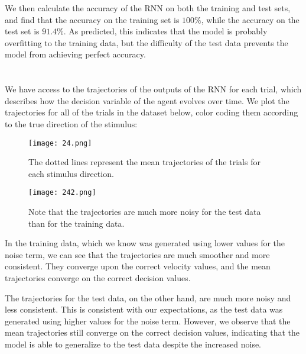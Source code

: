 \documentclass{article}
\begin{document}
We then calculate the accuracy of the RNN on both the training and test sets, and find that the accuracy on the training set is $100\%$, while the accuracy on the test set is $91.4\%$. As predicted, this indicates that the model is probably overfitting to the training data, but the difficulty of the test data prevents the model from achieving perfect accuracy.
\vspace{1em}


\section{}

We have access to the trajectories of the outputs of the RNN for each trial, which describes how the decision variable of the agent evolves over time. We plot the trajectories for all of the trials in the dataset below, color coding them according to the true direction of the stimulus:

\begin{figure}[ht]
    \centering
    \texttt{[image: 24.png]}
    \caption{The dotted lines represent the mean trajectories of the trials for each stimulus direction.}
\end{figure}

\begin{figure}[ht]
    \centering
    \texttt{[image: 242.png]}
    \caption{Note that the trajectories are much more noisy for the test data than for the training data.}
\end{figure}

\FloatBarrier
In the training data, which we know was generated using lower values for the noise term, we can see that the trajectories are much smoother and more consistent. They converge upon the correct velocity values, and the mean trajectories converge on the correct decision values.
\vspace{1em}

The trajectories for the test data, on the other hand, are much more noisy and less consistent. This is consistent with our expectations, as the test data was generated using higher values for the noise term. However, we observe that the mean trajectories still converge on the correct decision values, indicating that the model is able to generalize to the test data despite the increased noise.
\vspace{1em}


\section{}
\end{document}
